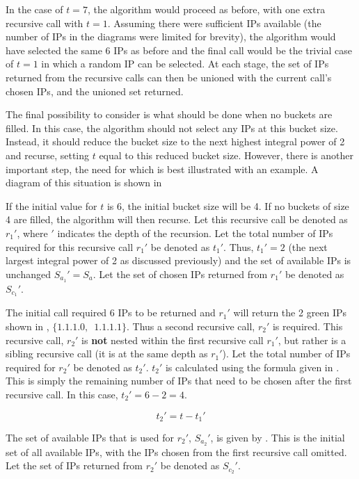 In the case of $t = 7$, the algorithm would proceed as before, with one extra recursive call with $t = 1$. Assuming there were sufficient IPs available (the number of IPs in the diagrams were limited for brevity), the algorithm would have selected the same 6 IPs as before and the final call would be the trivial case of $t = 1$ in which a random IP can be selected. At each stage, the set of IPs returned from the recursive calls can then be unioned with the current call's chosen IPs, and the unioned set returned. 

The final possibility to consider is what should be done when no buckets are filled. In this case, the algorithm should not select any IPs at this bucket size. Instead, it should reduce the bucket size to the next highest integral power of 2 and recurse, setting $t$ equal to this reduced bucket size. However, there is another important step, the need for which is best illustrated with an example. A diagram of this situation is shown in 

If the initial value for $t$ is 6, the initial bucket size will be 4. If no buckets of size 4 are filled, the algorithm will then recurse. Let this recursive call be denoted as $r_1'$, where $'$ indicates the depth of the recursion. Let the total number of IPs required for this recursive call $r_1'$ be denoted as $t_1'$. Thus, $t_1' = 2$ (the next largest integral power of 2 as discussed previously) and the set of available IPs is unchanged $S_{a_1}' = S_a$. Let the set of chosen IPs returned from $r_1'$ be denoted as $S_{c_1}'$.

The initial call required 6 IPs to be returned and $r_1'$ will return the 2 green IPs shown in , $\{1.1.1.0,\enspace1.1.1.1\}$. Thus a second recursive call, $r_2'$ is required. This recursive call, $r_2'$ is \textbf{not} nested within the first recursive call $r_1'$, but rather is a sibling recursive call (it is at the same depth as $r_1'$).  Let the total number of IPs required for $r_2'$ be denoted as $t_2'$. $t_2'$ is calculated using the formula given in . This is simply the remaining number of IPs that need to be chosen after the first recursive call. In this case, $t_2' = 6 - 2 = 4$. 

\begin{equation}\label{eq:secondRecurseT2}
t_2' = t - t_1'
\end{equation}

The set of available IPs that is used for $r_2'$, $S_{a_2}'$, is given by . This is the initial set of all available IPs, with the IPs chosen from the first recursive call omitted. Let the set of IPs returned from $r_2'$ be denoted as $S_{c_2}'$.

